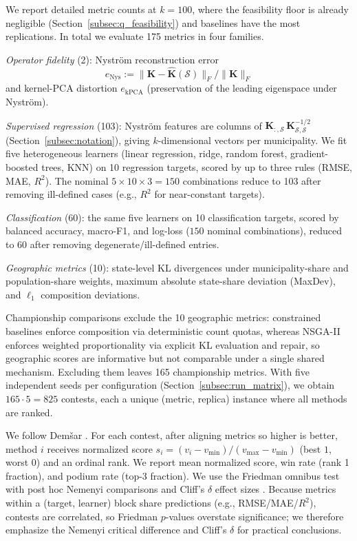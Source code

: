 \documentclass[10pt,journal]{IEEEtran}
\newcommand{\1}{\mathbf{1}}
\newcommand{\bK}{\mathbf{K}}
\newcommand{\Sel}{\mathcal{S}}
\theoremstyle{ieeethm}
\begin{document}
We report detailed metric counts at $k=100$, where the feasibility floor is already negligible (Section~\ref{subsec:q_feasibility}) and baselines have the most replications. In total we evaluate 175 metrics in four families.

\emph{Operator fidelity} (2): Nyström reconstruction error
\begin{equation*}
e_{\mathrm{Nys}}
:=
\|\bK-\widehat{\bK}(\Sel)\|_F/\|\bK\|_F
\end{equation*}
and kernel-PCA distortion $e_{\mathrm{kPCA}}$ (preservation of the leading eigenspace under Nyström).

\emph{Supervised regression} (103): Nyström features are columns of $\bK_{:,\Sel}\,\bK_{\Sel,\Sel}^{-1/2}$ (Section~\ref{subsec:notation}), giving $k$-dimensional vectors per municipality. We fit five heterogeneous learners (linear regression, ridge, random forest, gradient-boosted trees, KNN) on 10 regression targets, scored by up to three rules (RMSE, MAE, $R^2$). The nominal $5\times 10\times 3=150$ combinations reduce to 103 after removing ill-defined cases (e.g., $R^2$ for near-constant targets).

\emph{Classification} (60): the same five learners on 10 classification targets, scored by balanced accuracy, macro-F1, and log-loss ($150$ nominal combinations), reduced to 60 after removing degenerate/ill-defined entries.

\emph{Geographic metrics} (10): state-level KL divergences under municipality-share and population-share weights, maximum absolute state-share deviation (MaxDev), and $\ell_1$ composition deviations.

Championship comparisons exclude the 10 geographic metrics: constrained baselines enforce composition via deterministic count quotas, whereas NSGA-II enforces weighted proportionality via explicit KL evaluation and repair, so geographic scores are informative but not comparable under a single shared mechanism. Excluding them leaves 165 championship metrics. With five independent seeds per configuration (Section~\ref{subsec:run_matrix}), we obtain $165\cdot 5=825$ contests, each a unique (metric, replica) instance where all methods are ranked.

We follow Dem\v{s}ar \cite{demsar2006}. For each contest, after aligning metrics so higher is better, method $i$ receives normalized score $s_i=(v_i-v_{\min})/(v_{\max}-v_{\min})$ (best $1$, worst $0$) and an ordinal rank. We report mean normalized score, win rate (rank 1 fraction), and podium rate (top-3 fraction). We use the Friedman omnibus test with post hoc Nemenyi comparisons \cite{demsar2006} and Cliff's $\delta$ effect sizes \cite{cliff1993dominance}. Because metrics within a (target, learner) block share predictions (e.g., RMSE/MAE/$R^2$), contests are correlated, so Friedman $p$-values overstate significance; we therefore emphasize the Nemenyi critical difference and Cliff's $\delta$ for practical conclusions.
\end{document}
